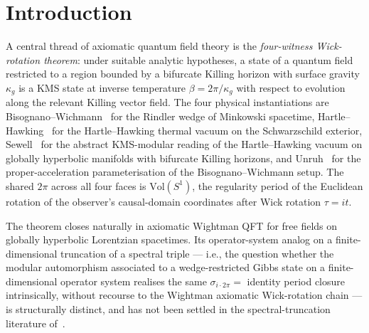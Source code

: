 \documentclass[11pt,a4paper]{article}
\theoremstyle{plain}
\theoremstyle{definition}
\newcommand{\Vol}{\mathrm{Vol}}
\begin{document}
\section{Introduction}\label{sec:intro}

A central thread of axiomatic quantum field theory is the
\emph{four-witness Wick-rotation theorem}: under suitable analytic
hypotheses, a state of a quantum field restricted to a region
bounded by a bifurcate Killing horizon with surface gravity
$\kappa_g$ is a KMS state at inverse temperature
$\beta = 2\pi / \kappa_g$ with respect to evolution along the
relevant Killing vector field. The four physical instantiations are
Bisognano--Wichmann~\cite{bisognano_wichmann1976} for the Rindler
wedge of Minkowski spacetime, Hartle--Hawking~\cite{hartle_hawking1976}
for the Hartle--Hawking thermal vacuum on the Schwarzschild exterior,
Sewell~\cite{sewell1982} for the abstract KMS-modular reading of the
Hartle--Hawking vacuum on globally hyperbolic manifolds with bifurcate
Killing horizons, and Unruh~\cite{unruh1976} for the proper-acceleration
parameterisation of the Bisognano--Wichmann setup. The shared $2\pi$
across all four faces is $\Vol(S^1)$, the regularity period of the
Euclidean rotation of the observer's causal-domain coordinates after
Wick rotation $\tau = i t$.

The theorem closes naturally in axiomatic Wightman QFT for free fields
on globally hyperbolic Lorentzian spacetimes. Its operator-system
analog on a finite-dimensional truncation of a spectral triple --- i.e.,
the question whether the modular automorphism associated to a
wedge-restricted Gibbs state on a finite-dimensional operator system
realises the same $\sigma_{i \cdot 2\pi} = $ identity period closure
intrinsically, without recourse to the Wightman axiomatic Wick-rotation
chain --- is structurally distinct, and has not been settled in the
spectral-truncation literature
of~\cite{connes_vs2021, leimbach_vs2024}.
\end{document}
